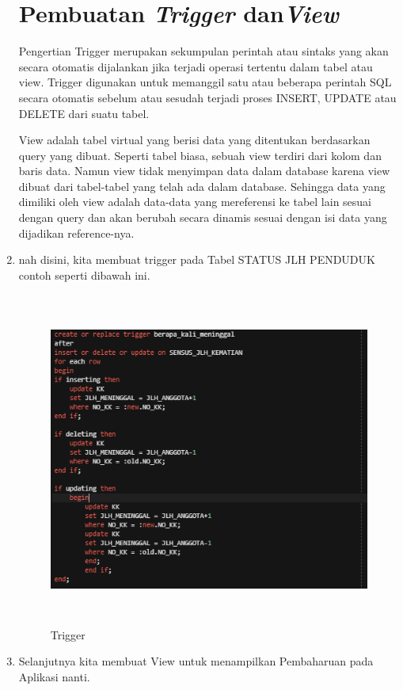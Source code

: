 \begin{enumerate}
\section{Pembuatan \textit{Trigger} dan\textit{View}}
\par Pengertian Trigger merupakan sekumpulan perintah atau sintaks yang akan secara otomatis dijalankan jika terjadi operasi tertentu dalam tabel atau view. Trigger digunakan untuk memanggil satu atau beberapa perintah SQL secara otomatis sebelum atau sesudah terjadi proses INSERT, UPDATE atau DELETE dari suatu tabel.
\par View adalah tabel virtual yang berisi data yang ditentukan berdasarkan query yang dibuat. Seperti tabel biasa, sebuah view terdiri dari kolom dan baris data. Namun view tidak menyimpan data dalam database karena view dibuat dari tabel-tabel yang telah ada dalam database. Sehingga data yang dimiliki oleh view adalah data-data yang mereferensi ke tabel lain sesuai dengan query dan akan berubah secara dinamis sesuai dengan isi data yang dijadikan reference-nya.
\item nah disini, kita membuat trigger pada Tabel STATUS JLH PENDUDUK contoh seperti dibawah ini.
\begin{figure}[!htbp]
\centering
\includegraphics[width=13cm,height=11cm]{figures/H.PNG}
\caption{Trigger}
\label{penanda}
\end{figure}
\item Selanjutnya kita membuat View untuk menampilkan Pembaharuan pada Aplikasi nanti.
\begin{figure}[!htbp]

\end{figure}
\end{enumerate}
